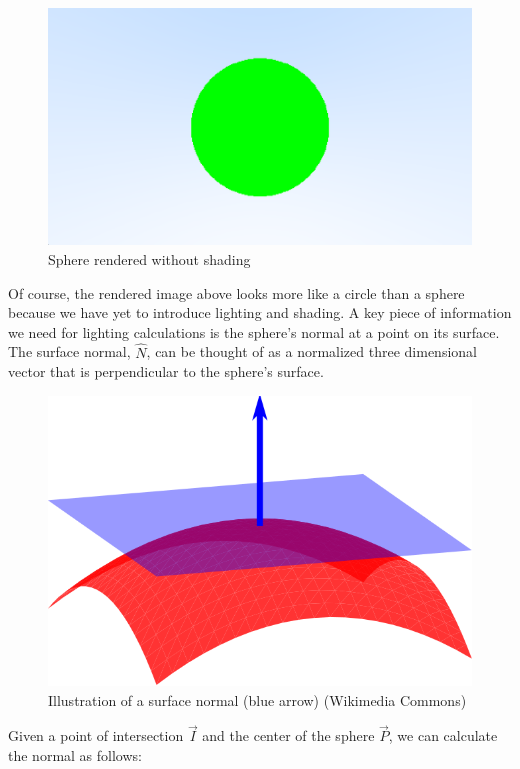 \begin{figure}[H]
    \centering
    \includegraphics[scale=0.5]{figures/GreenSphere.png}
    \caption{Sphere rendered without shading}
    \label{fig:green_sphere}
\end{figure}
\noindent
Of course, the rendered image above looks more like a circle than a sphere because we have yet to introduce lighting and shading. A key piece of information we need for lighting calculations is the sphere's normal at a point on its surface. The surface normal, $\hat{N}$, can be thought of as a normalized three dimensional vector that is perpendicular to the sphere's surface. 
\begin{figure}[H]
    \centering
    \includegraphics[scale=0.3]{figures/normal.png}
    \caption{Illustration of a surface normal (blue arrow) (Wikimedia Commons)}
    \label{fig:normal_example}
\end{figure}
\noindent
Given a point of intersection $\Vec{I}$ and the center of the sphere $\Vec{P}$, we can calculate the normal as follows:

